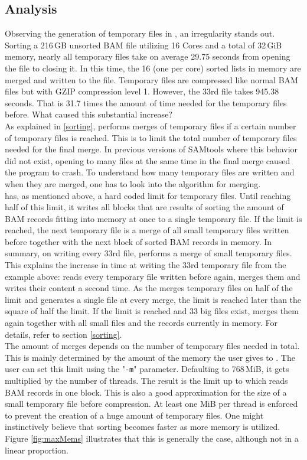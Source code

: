 \subsection{Analysis}
Observing the generation of temporary files in \sort, an irregularity stands out. Sorting a 216\,GB unsorted BAM file utilizing 16 Cores and a total of 32\,GiB memory, nearly all temporary files take on average 29.75 seconds from opening the file to closing it. In this time, the 16 (one per core) sorted lists in memory are merged and written to the file. Temporary files are compressed like normal BAM files but with GZIP compression level 1. However, the 33rd file takes 945.38 seconds. That is 31.7 times the amount of time needed for the temporary files before. What caused this substantial increase? \\
As explained in \ref{sorting}, \sort performs merges of temporary files if a certain number of temporary files is reached. This is to limit the total number of temporary files needed for the final merge. In previous versions of SAMtools where this behavior did not exist, opening to many files at the same time in the final merge caused the program to crash.
To understand how many temporary files are written and when they are merged, one has to look into the algorithm for merging. \\
\sort has, as mentioned above, a hard coded limit for temporary files. Until reaching half of this limit, it writes all blocks that are results of sorting the amount of BAM records fitting into memory at once to a single temporary file. If the limit is reached, the next temporary file is a merge of all small temporary files written before together with the next block of sorted BAM records in memory. In summary, on writing every 33rd file, \sort performs a merge of small temporary files. This explains the increase in time at writing the 33rd temporary file from the example above: \sort reads every temporary file written before again, merges them and writes their content a second time. As the \sort merges temporary files on half of the limit and generates a single file at every merge, the limit is reached later than the square of half the limit. If the limit is reached and 33 big files exist, \sort merges them again together with all small files and the records currently in memory. For details, refer to section \ref{sorting}. \\
The amount of merges depends on the number of temporary files needed in total. This is mainly determined by the amount of the memory the user gives to \sort. The user can set this limit using the "\texttt{-m}" parameter. Defaulting to 768\,MiB, it gets multiplied by the number of threads. The result is the limit up to which \sort reads BAM records in one block. This is also a good approximation for the size of a small temporary file before compression. At least one MiB per thread is enforced to prevent the creation of a huge amount of temporary files. One might instinctively believe that sorting becomes faster as more memory is utilized. Figure \ref{fig:maxMems} illustrates that this is generally the case, although not in a linear proportion.
